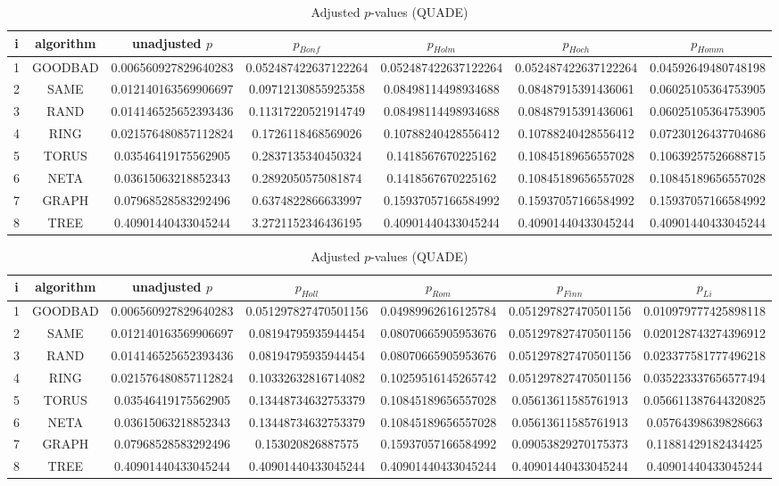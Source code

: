 \documentclass[a4paper,10pt]{article}
\begin{document}
\begin{landscape}
\begin{table}[!htp]
\centering\scriptsize
\caption{Adjusted $p$-values (QUADE)}
\begin{tabular}{ccccccc}
i&algorithm&unadjusted $p$&$p_{Bonf}$&$p_{Holm}$&$p_{Hoch}$&$p_{Homm}$\\
\hline
1& GOODBAD&0.006560927829640283&0.052487422637122264&0.052487422637122264&0.052487422637122264&0.04592649480748198\\
2& SAME&0.012140163569906697&0.09712130855925358&0.08498114498934688&0.08487915391436061&0.06025105364753905\\
3& RAND&0.014146525652393436&0.11317220521914749&0.08498114498934688&0.08487915391436061&0.06025105364753905\\
4& RING&0.021576480857112824&0.1726118468569026&0.10788240428556412&0.10788240428556412&0.07230126437704686\\
5& TORUS&0.03546419175562905&0.2837135340450324&0.1418567670225162&0.10845189656557028&0.10639257526688715\\
6& NETA&0.03615063218852343&0.2892050575081874&0.1418567670225162&0.10845189656557028&0.10845189656557028\\
7& GRAPH&0.07968528583292496&0.6374822866633997&0.15937057166584992&0.15937057166584992&0.15937057166584992\\
8& TREE&0.40901440433045244&3.2721152346436195&0.40901440433045244&0.40901440433045244&0.40901440433045244\\
\hline
\end{tabular}
\end{table}

\begin{table}[!htp]
\centering\scriptsize
\caption{Adjusted $p$-values (QUADE)}
\begin{tabular}{ccccccc}
i&algorithm&unadjusted $p$&$p_{Holl}$&$p_{Rom}$&$p_{Finn}$&$p_{Li}$\\
\hline
1& GOODBAD&0.006560927829640283&0.051297827470501156&0.04989962616125784&0.051297827470501156&0.010979777425898118\\
2& SAME&0.012140163569906697&0.08194795935944454&0.08070665905953676&0.051297827470501156&0.020128743274396912\\
3& RAND&0.014146525652393436&0.08194795935944454&0.08070665905953676&0.051297827470501156&0.023377581777496218\\
4& RING&0.021576480857112824&0.10332632816714082&0.10259516145265742&0.051297827470501156&0.035223337656577494\\
5& TORUS&0.03546419175562905&0.13448734632753379&0.10845189656557028&0.05613611585761913&0.056611387644320825\\
6& NETA&0.03615063218852343&0.13448734632753379&0.10845189656557028&0.05613611585761913&0.05764398639828663\\
7& GRAPH&0.07968528583292496&0.153020826887575&0.15937057166584992&0.09053829270175373&0.11881429182434425\\
8& TREE&0.40901440433045244&0.40901440433045244&0.40901440433045244&0.40901440433045244&0.40901440433045244\\
\hline
\end{tabular}
\end{table}

\end{landscape}
\end{document}
